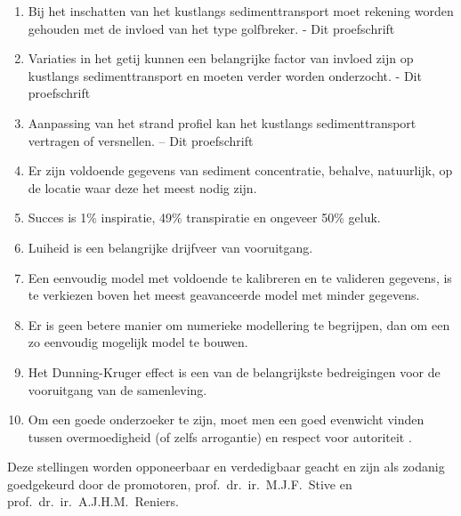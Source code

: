 \documentclass{dissertation}
\begin{document}
{\begin{enumerate}
\item Bij het inschatten van het kustlangs sedimenttransport moet rekening worden gehouden met de invloed van het type  golfbreker. - Dit proefschrift
\item Variaties in het getij kunnen een belangrijke factor van invloed zijn op kustlangs sedimenttransport en moeten verder worden onderzocht. - Dit proefschrift
\item Aanpassing van het strand profiel kan het kustlangs sedimenttransport vertragen of versnellen. – Dit proefschrift
\item Er zijn voldoende gegevens van sediment concentratie, behalve, natuurlijk, op de locatie waar deze het meest nodig zijn.
\item Succes is 1\% inspiratie, 49\% transpiratie en ongeveer 50\% geluk.
\item Luiheid is een belangrijke drijfveer van vooruitgang.
\item Een eenvoudig model met voldoende te kalibreren en te valideren gegevens, is te verkiezen boven het meest geavanceerde model met minder gegevens.
\item Er is geen betere manier om numerieke modellering te begrijpen, dan om een zo eenvoudig mogelijk model te bouwen.
\item Het Dunning-Kruger effect is een van de belangrijkste bedreigingen voor de vooruitgang van de samenleving.
\item Om een goede onderzoeker te zijn, moet men een goed evenwicht vinden tussen overmoedigheid (of zelfs arrogantie) en respect voor autoriteit .

\end{enumerate}

\bigskip
\bigskip

\begin{center}
Deze stellingen worden opponeerbaar en verdedigbaar geacht en zijn als zodanig goedgekeurd door de promotoren, prof.\ dr.\ ir.\ M.J.F.\ Stive en prof.\ dr.\ ir.\ A.J.H.M.\ Reniers.
\end{center}

}
\end{document}
